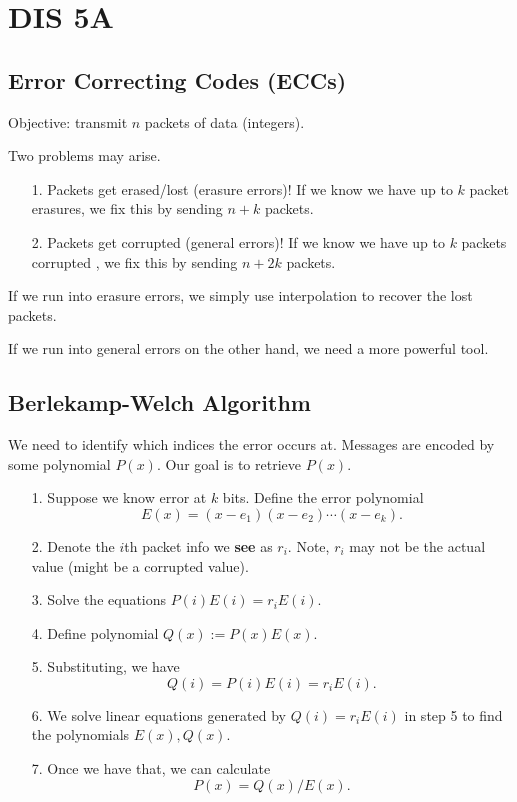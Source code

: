 \section{DIS 5A}

\subsection{Error Correcting Codes (ECCs)}
Objective: transmit $n$ packets of data (integers). 

Two problems may arise. 

\begin{itemize}
    \item[1.] Packets get erased/lost (erasure errors)! If we know we have up to $k$ packet erasures, we fix this by sending $n+k$ packets. 
    \item[2.] Packets get corrupted (general errors)! If we know we have up to $k$ packets corrupted , we fix this by sending $n+2k$ packets. 
\end{itemize}

If we run into erasure errors, we simply use interpolation to recover the lost packets. 

If we run into general errors on the other hand, we need a more powerful tool. 

\subsection{Berlekamp-Welch Algorithm}
We need to identify which indices the error occurs at. Messages are encoded by some polynomial $P(x)$. Our goal is to retrieve $P(x)$. 
\begin{itemize}
    \item[1.] Suppose we know error at $k$ bits. Define the error polynomial \[ E(x) = (x-e_1)(x-e_2)\cdots(x-e_k). \]
    \item[2.] Denote the $i$th packet info we \textbf{see} as $r_i$. Note, $r_i$ may not be the actual value (might be a corrupted value). 
    \item[3.] Solve the equations $P(i)E(i) = r_i E(i)$. 
    \item[4.] Define polynomial $Q(x) := P(x)E(x)$. 
    \item[5.] Substituting, we have \[Q(i) =  P(i) E(i) = r_i E(i). \] 
    \item[6.] We solve linear equations generated by $Q(i) = r_i E(i)$ in step 5 to find the polynomials $E(x), Q(x)$. 
    \item[7.] Once we have that, we can calculate \[ P(x) = Q(x) / E(x). \] 
\end{itemize}

